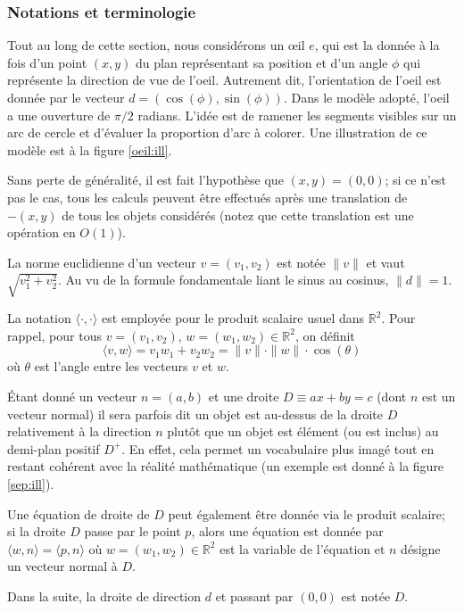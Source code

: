 \subsubsection*{Notations et terminologie}
Tout au long de cette section, nous considérons un \oe{}il $e$, qui est la donnée à
la fois d'un point $(x, y)$ du plan représentant sa position et d'un angle $\phi$
qui représente la direction de vue de l'oeil. Autrement dit, l'orientation de
l'oeil est donnée par le vecteur $d=(\cos(\phi), \sin(\phi))$. Dans le modèle
adopté, l'oeil a une ouverture de $\pi/2$ radians. L'idée est de ramener
les segments visibles sur un arc de cercle et d'évaluer la proportion d'arc
à colorer. Une illustration de ce modèle est à la figure \ref{oeil:ill}.



Sans perte de généralité, il est fait l'hypothèse que $(x, y) = (0, 0)$;
si ce n'est pas le cas, tous les
calculs peuvent être effectués après une translation de $-(x, y)$ de tous
les objets considérés (notez que cette translation est une opération en $O(1)$).

La norme euclidienne d'un vecteur $v = (v_1, v_2)$ est notée
$\|v\|$ et vaut $\sqrt{v_1^2 + v_2^2}$. Au vu de la formule fondamentale liant le
sinus au cosinus, $\|d\| = 1$.

La notation $\langle \cdot,\cdot\rangle$ est employée pour le produit
scalaire usuel dans $\mathbb R^2$. Pour rappel,
pour tous $v=(v_1, v_2)$, $w=(w_1, w_2)\in\mathbb R^2$, on définit
$$\langle v, w\rangle = v_1 w_1 + v_2 w_2 = \|v\|\cdot\|w\|\cdot\cos(\theta)$$
où $\theta$ est l'angle entre les vecteurs $v$ et $w$.


\'Etant  donné un vecteur $n = (a, b)$ et une droite $D\equiv ax+by=c$
(dont $n$ est un vecteur normal) il sera parfois dit
\og un objet est au-dessus de la droite $D$ relativement à la direction $n$\fg{}
plutôt que \og{}un objet est élément (ou est inclus) au demi-plan positif $D^+$\fg{}.
En effet, cela permet un vocabulaire plus imagé tout en restant cohérent
avec la réalité mathématique (un exemple est donné à la figure \ref{sep:ill}).

Une équation de droite de $D$ peut également être donnée via le produit scalaire;
si la droite $D$ passe par le point $p$, alors une équation est donnée par
$\langle w, n\rangle = \langle p, n\rangle$ où $w=(w_1, w_2)\in\mathbb R^2$ est
la variable de l'équation et $n$ désigne un vecteur normal à $D$.

Dans la suite, la droite de direction $d$ et passant par $(0, 0)$ est notée $D$.

